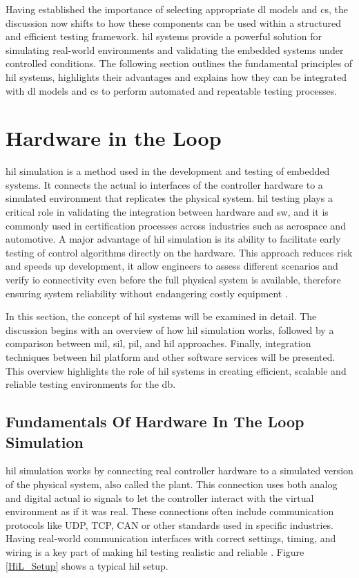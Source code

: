 Having established the importance of selecting appropriate \gls{dl} models and \gls{cs}, the discussion now shifts to how these components can be used within a structured and efficient testing framework. \gls{hil} systems provide a powerful solution for simulating real-world environments and validating the embedded systems under controlled conditions. The following section outlines the fundamental principles of \gls{hil} systems, highlights their advantages and explains how they can be integrated with \gls{dl} models and \gls{cs} to perform automated and repeatable testing processes.

\section{Hardware in the Loop}
\gls{hil} simulation is a method used in the development and testing of embedded systems. It connects the actual \gls{io} interfaces of the controller hardware to a simulated environment that replicates the physical system. \gls{hil} testing plays a critical role in validating the integration between hardware and \gls{sw}, and it is commonly used in certification processes across industries such as aerospace and automotive. A major advantage of \gls{hil} simulation is its ability to facilitate early testing of control algorithms directly on the hardware. This approach reduces risk and speeds up development, it allow engineers to assess different scenarios and verify \gls{io} connectivity even before the full physical system is available, therefore ensuring system reliability without endangering costly equipment \cite{HiL_Testing}.

In this section, the concept of \gls{hil} systems will be examined in detail. The discussion begins with an overview of how \gls{hil} simulation works, followed by a comparison between \gls{mil}, \gls{sil}, \gls{pil}, and \gls{hil} approaches. Finally, integration techniques between \gls{hil} platform and other software services will be presented. This overview highlights the role of \gls{hil} systems in creating efficient, scalable and reliable testing environments for the \gls{db}.

\subsection{Fundamentals Of Hardware In The Loop Simulation}
\gls{hil} simulation works by connecting real controller hardware to a simulated version of the physical system, also called the plant. This connection uses both analog and digital actual \gls{io} signals to let the controller interact with the virtual environment as if it was real. These connections often include communication protocols like UDP, TCP, CAN or other standards used in specific industries. Having real-world communication interfaces with correct settings, timing, and wiring is a key part of making \gls{hil} testing realistic and reliable \cite{HiL_Testing}. Figure \ref{HiL_Setup} shows a typical \gls{hil} setup.

